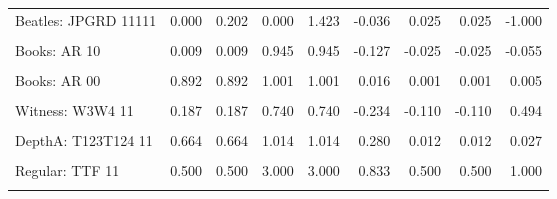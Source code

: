 \documentclass[10pt,]{scrartcl}
\begin{document}
\begin{table}[H]
{\begin{tabular}{lrrrrrrrr}
Beatles: JPGRD 11111 & 0.000 & 0.202 & 0.000 & 1.423 & -0.036 & 0.025 & 0.025 & -1.000\\
\cellcolor{gray!6}{Books: AR 11} & \cellcolor{gray!6}{0.014} & \cellcolor{gray!6}{0.014} & \cellcolor{gray!6}{1.493} & \cellcolor{gray!6}{1.493} & \cellcolor{gray!6}{0.212} & \cellcolor{gray!6}{0.027} & \cellcolor{gray!6}{0.027} & \cellcolor{gray!6}{0.055}\\
Books: AR 10 & 0.009 & 0.009 & 0.945 & 0.945 & -0.127 & -0.025 & -0.025 & -0.055\\
\cellcolor{gray!6}{Books: AR 01} & \cellcolor{gray!6}{0.100} & \cellcolor{gray!6}{0.100} & \cellcolor{gray!6}{0.995} & \cellcolor{gray!6}{0.995} & \cellcolor{gray!6}{-0.101} & \cellcolor{gray!6}{-0.003} & \cellcolor{gray!6}{-0.003} & \cellcolor{gray!6}{-0.005}\\
Books: AR 00 & 0.892 & 0.892 & 1.001 & 1.001 & 0.016 & 0.001 & 0.001 & 0.005\\
\cellcolor{gray!6}{Witness: W1W2 11} & \cellcolor{gray!6}{0.451} & \cellcolor{gray!6}{0.451} & \cellcolor{gray!6}{3.551} & \cellcolor{gray!6}{3.551} & \cellcolor{gray!6}{0.771} & \cellcolor{gray!6}{0.446} & \cellcolor{gray!6}{0.446} & \cellcolor{gray!6}{0.729}\\
Witness: W3W4 11 & 0.187 & 0.187 & 0.740 & 0.740 & -0.234 & -0.110 & -0.110 & 0.494\\
\cellcolor{gray!6}{Witness: W4W5 11} & \cellcolor{gray!6}{0.365} & \cellcolor{gray!6}{0.365} & \cellcolor{gray!6}{1.260} & \cellcolor{gray!6}{1.260} & \cellcolor{gray!6}{0.218} & \cellcolor{gray!6}{0.110} & \cellcolor{gray!6}{0.110} & \cellcolor{gray!6}{0.602}\\
DepthA: T123T124 11 & 0.664 & 0.664 & 1.014 & 1.014 & 0.280 & 0.012 & 0.012 & 0.027\\
\cellcolor{gray!6}{DepthB: T123T145 11} & \cellcolor{gray!6}{0.331} & \cellcolor{gray!6}{0.331} & \cellcolor{gray!6}{0.996} & \cellcolor{gray!6}{0.996} & \cellcolor{gray!6}{-0.047} & \cellcolor{gray!6}{-0.003} & \cellcolor{gray!6}{-0.003} & \cellcolor{gray!6}{-0.004}\\
Regular: TTF 11 & 0.500 & 0.500 & 3.000 & 3.000 & 0.833 & 0.500 & 0.500 & 1.000\\
\cellcolor{gray!6}{Dodecahedron: TTF 11} & \cellcolor{gray!6}{0.500} & \cellcolor{gray!6}{0.500} & \cellcolor{gray!6}{6.000} & \cellcolor{gray!6}{6.000} & \cellcolor{gray!6}{0.917} & \cellcolor{gray!6}{0.625} & \cellcolor{gray!6}{0.625} & \cellcolor{gray!6}{1.000}\\
\bottomrule
\end{tabular}}
\end{table}
\end{document}
